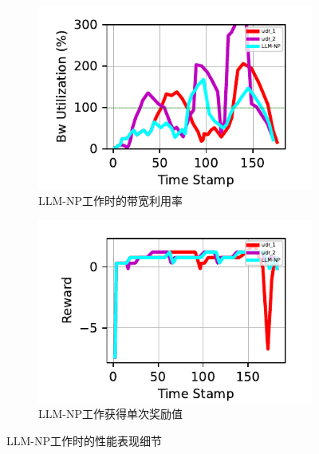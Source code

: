 \begin{figure}[ht]
\begin{subfigure}[t]{0.47\linewidth}
  \centering
  \includegraphics[width=\linewidth]{figures/chap04/evaluation_single_algo_detail/bandwidth_utilization_88_plot.pdf}
  \caption{LLM-NP工作时的带宽利用率}
  \label{detail_bandwid_util}
\end{subfigure}%
\begin{subfigure}[t]{0.47\linewidth}
  \centering
  \includegraphics[width=\linewidth]{figures/chap04/evaluation_single_algo_detail/reward_88_plot.pdf}
  \caption{LLM-NP工作获得单次奖励值}
  \label{detail_reward}
\end{subfigure}

\caption{LLM-NP工作时的性能表现细节}
\label{fig:single-algo-detail}
\end{figure}
